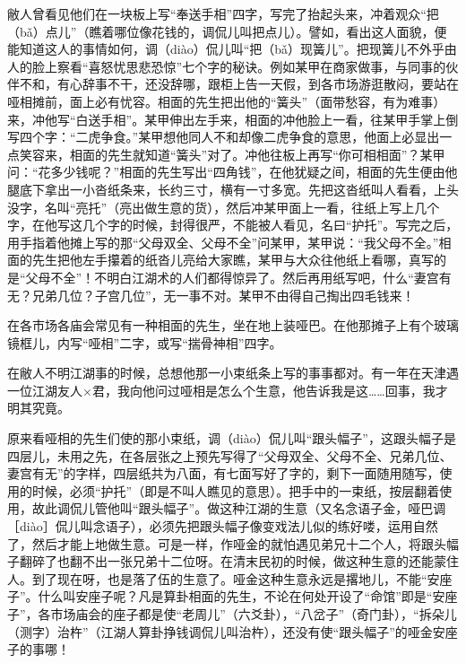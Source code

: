 \documentclass[12pt,UTF8]{ctexbook}
\begin{document}
敝人曾看见他们在一块板上写“奉送手相”四字，写完了抬起头来，冲着观众“把（bǎ）点儿”（瞧着哪位像花钱的，调侃儿叫把点儿）。譬如，看出这人面貌，便能知道这人的事情如何，调（diào）侃儿叫“把（bǎ）现簧儿”。把现簧儿不外乎由人的脸上察看“喜怒忧思悲恐惊”七个字的秘诀。例如某甲在商家做事，与同事的伙伴不和，有心辞事不干，还没辞哪，跟柜上告一天假，到各市场游逛散闷，要站在哑相摊前，面上必有忧容。相面的先生把出他的“簧头”（面带愁容，有为难事）来，冲他写“白送手相”。某甲伸出左手来，相面的冲他脸上一看，往某甲手掌上倒写四个字：“二虎争食。”某甲想他同人不和却像二虎争食的意思，他面上必显出一点笑容来，相面的先生就知道“簧头”对了。冲他往板上再写“你可相相面”？某甲问：“花多少钱呢？”相面的先生写出“四角钱”，在他犹疑之间，相面的先生便由他腿底下拿出一小沓纸条来，长约三寸，横有一寸多宽。先把这沓纸叫人看看，上头没字，名叫“亮托”（亮出做生意的货），然后冲某甲面上一看，往纸上写上几个字，在他写这几个字的时候，封得很严，不能被人看见，名曰“护托”。写完之后，用手指着他摊上写的那“父母双全、父母不全”问某甲，某甲说：“我父母不全。”相面的先生把他左手攥着的纸沓儿亮给大家瞧，某甲与大众往他纸上看哪，真写的是“父母不全”！不明白江湖术的人们都得惊异了。然后再用纸写吧，什么“妻宫有无？兄弟几位？子宫几位”，无一事不对。某甲不由得自己掏出四毛钱来！

在各市场各庙会常见有一种相面的先生，坐在地上装哑巴。在他那摊子上有个玻璃镜框儿，内写“哑相”二字，或写“揣骨神相”四字。



在敝人不明江湖事的时候，总想他那一小束纸条上写的事事都对。有一年在天津遇一位江湖友人×君，我向他问过哑相是怎么个生意，他告诉我是这……回事，我才明其究竟。

原来看哑相的先生们使的那小束纸，调（diào）侃儿叫“跟头幅子”，这跟头幅子是四层儿，未用之先，在各层张之上预先写得了“父母双全、父母不全、兄弟几位、妻宫有无”的字样，四层纸共为八面，有七面写好了字的，剩下一面随用随写，使用的时候，必须“护托”（即是不叫人瞧见的意思）。把手中的一束纸，按层翻着使用，故此调侃儿管他叫“跟头幅子”。做这种江湖的生意（又名念语子金，哑巴调［diào］侃儿叫念语子），必须先把跟头幅子像变戏法儿似的练好喽，运用自然了，然后才能上地做生意。可是一样，作哑金的就怕遇见弟兄十二个人，将跟头幅子翻碎了也翻不出一张兄弟十二位呀。在清末民初的时候，做这种生意的还能蒙住人。到了现在呀，也是落了伍的生意了。哑金这种生意永远是撂地儿，不能“安座子”。什么叫安座子呢？凡是算卦相面的先生，不论在何处开设了“命馆”即是“安座子”，各市场庙会的座子都是使“老周儿”（六爻卦），“八岔子”（奇门卦），“拆朵儿（测字）治杵”（江湖人算卦挣钱调侃儿叫治杵），还没有使“跟头幅子”的哑金安座子的事哪！
\end{document}
